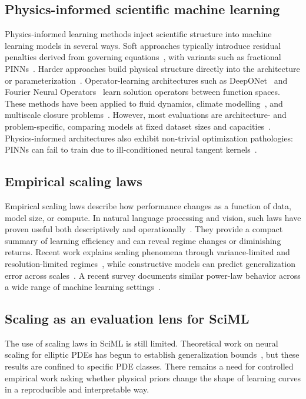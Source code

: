 \documentclass[11pt]{article}
\begin{document}
\subsection{Physics-informed scientific machine learning}

Physics-informed learning methods inject scientific structure into machine learning models in several ways.
Soft approaches typically introduce residual penalties derived from governing equations~\cite{raissi2019pinn,cuomo2022}, with variants such as fractional PINNs~\cite{pang2019fpinns}.
Harder approaches build physical structure directly into the architecture or parameterization~\cite{willard2022,chen2018node}.
Operator-learning architectures such as DeepONet~\cite{lu2019deeponet} and Fourier Neural Operators~\cite{li2020fno} learn solution operators between function spaces.
These methods have been applied to fluid dynamics, climate modelling~\cite{kashinath2021}, and multiscale closure problems~\cite{sanderse2024}.
However, most evaluations are architecture- and problem-specific, comparing models at fixed dataset sizes and capacities~\cite{cuomo2022,ren2025}.
Physics-informed architectures also exhibit non-trivial optimization pathologies: PINNs can fail to train due to ill-conditioned neural tangent kernels~\cite{wang2022ntk}.

\subsection{Empirical scaling laws}

Empirical scaling laws describe how performance changes as a function of data, model size, or compute.
In natural language processing and vision, such laws have proven useful both descriptively and operationally~\cite{kaplan2020,hestness2017,henighan2020}.
They provide a compact summary of learning efficiency and can reveal regime changes or diminishing returns.
Recent work explains scaling phenomena through variance-limited and resolution-limited regimes~\cite{bahri2024}, while constructive models can predict generalization error across scales~\cite{rosenfeld2019}.
A recent survey documents similar power-law behavior across a wide range of machine learning settings~\cite{wang2024scaling}.

\subsection{Scaling as an evaluation lens for SciML}

The use of scaling laws in SciML is still limited.
Theoretical work on neural scaling for elliptic PDEs has begun to establish generalization bounds~\cite{lu2021elliptic}, but these results are confined to specific PDE classes.
There remains a need for controlled empirical work asking whether physical priors change the shape of learning curves in a reproducible and interpretable way.
\end{document}
